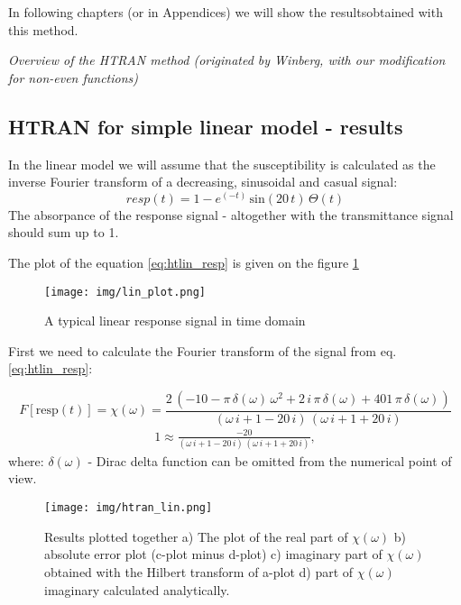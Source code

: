 \documentclass[12pt,twoside,a4paper]{article}
\numberwithin{equation}{subsection}
\numberwithin{figure}{subsection}
\begin{document}
In following chapters (or in Appendices) we will show the resultsobtained with this method.

\textit{Overview of the HTRAN method (originated by Winberg, with our modification for non-even functions)}

\subsection{HTRAN for simple linear model - results} \label{chap:htran_lin}

In the linear model we will assume that the susceptibility is calculated as the inverse Fourier transform of a decreasing,
sinusoidal and casual signal:
\begin{equation} \label{eq:htlin_resp}
  resp(t) = 1 - e^{( - t)}\,\mathrm{sin}(20\,t)\,\Theta (t) 
\end{equation}
The absorpance of the response signal - altogether with the transmittance signal should sum up to 1.

The plot of the equation \ref{eq:htlin_resp} is given on the figure \ref{fig:lin_plot}
\begin{figure}[H]
  \texttt{[image: img/lin\_plot.png]}
  \caption{A typical linear response signal in time domain \label{fig:lin_plot}}
\end{figure}

First we need to calculate the Fourier transform of the signal from eq. \ref{eq:htlin_resp}:

\begin{equation} \label{eq:htlin_fresp}
  F[\mathrm{resp}(t)] = \chi (\omega )=\frac {2\,( - 10 - \pi \,\delta (\omega )\,\omega^{2} + 2\,i\,\pi \,\delta (\omega ) +
  401\,\pi \,\delta (\omega))}{(\omega \,i + 1 - 20\,i)\,(\omega \,i + 1 + 20\,i)} 
\end{equation}
\begin{alignat*}{1}
  \approx \frac{ -20}{(\omega \,i + 1 -20\,i)\,(\omega \,i + 1 + 20\,i)},
\end{alignat*}
where: $\delta (\omega )$ - Dirac delta function can be omitted from the numerical point of view.

\begin{figure} 
  \texttt{[image: img/htran\_lin.png]}
  \caption{Results plotted together 
   a) The plot of the real part of $\chi (\omega )$ 
   b) absolute error plot (c-plot minus d-plot) 
   c) imaginary part of $\chi (\omega )$ obtained with the Hilbert transform of a-plot 
   d) part of $\chi (\omega )$ imaginary calculated analytically. \label{eq:htran_lin}
  }
\end{figure}
\end{document}
